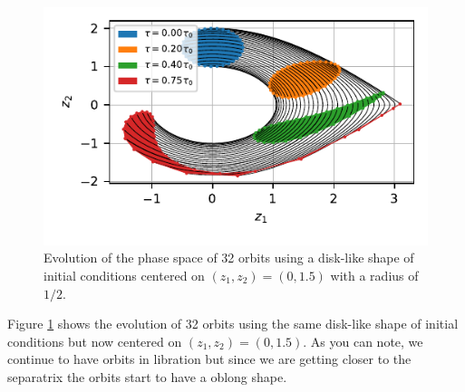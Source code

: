 \subsection{}
\begin{figure}
    \centering
    \includegraphics{CodeAndFigures/PendulumPhaseSpaceUs2e.pdf}
    \caption{Evolution of the phase space of 32 orbits using a disk-like shape of initial conditions centered on $(z_1,z_2)=(0,1.5)$ with a radius of $1/2$. }
    \label{fig:pend2e}
\end{figure}

Figure \ref{fig:pend2e} shows the evolution of 32 orbits using the same disk-like shape of initial conditions but now centered on $(z_1,z_2)=(0,1.5)$. As you can note, we continue to have orbits in libration but since we are getting closer to the separatrix the orbits start to have a oblong shape. 

\subsection{}


